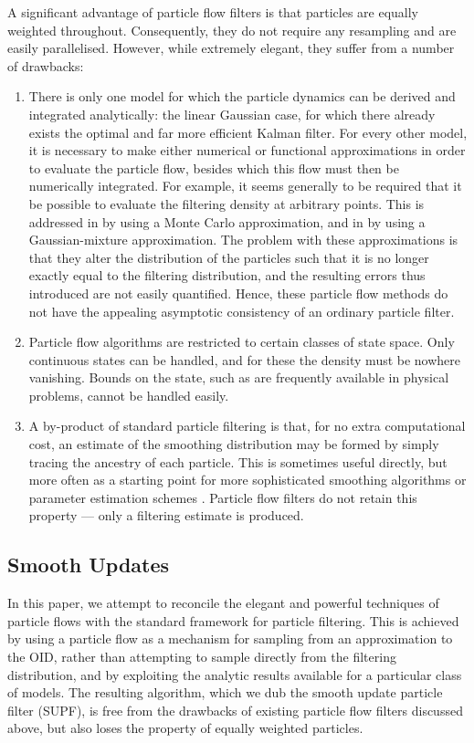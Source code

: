 \documentclass{statsoc}
\begin{document}
A significant advantage of particle flow filters is that particles are equally weighted throughout. Consequently, they do not require any resampling and are easily parallelised. However, while extremely elegant, they suffer from a number of drawbacks:
\begin{enumerate}
  \item There is only one model for which the particle dynamics can be derived and integrated analytically: the linear Gaussian case, for which there already exists the optimal and far more efficient Kalman filter. For every other model, it is necessary to make either numerical or functional approximations in order to evaluate the particle flow, besides which this flow must then be numerically integrated. For example, it seems generally to be required that it be possible to evaluate the filtering density at arbitrary points. This is addressed in \citep{Daum2012} by using a Monte Carlo approximation, and in \citep{Reich2012a} by using a Gaussian-mixture approximation. The problem with these approximations is that they alter the distribution of the particles such that it is no longer exactly equal to the filtering distribution, and the resulting errors thus introduced are not easily quantified. Hence, these particle flow methods do not have the appealing asymptotic consistency of an ordinary particle filter.
  \item Particle flow algorithms are restricted to certain classes of state space. Only continuous states can be handled, and for these the density must be nowhere vanishing. Bounds on the state, such as are frequently available in physical problems, cannot be handled easily.
  \item A by-product of standard particle filtering is that, for no extra computational cost, an estimate of the smoothing distribution may be formed by simply tracing the ancestry of each particle. This is sometimes useful directly, but more often as a starting point for more sophisticated smoothing algorithms \citep{Godsill2004,Bunch2012} or parameter estimation schemes \citep{Andrieu2010}. Particle flow filters do not retain this property --- only a filtering estimate is produced.
\end{enumerate}

\subsection{Smooth Updates}

In this paper, we attempt to reconcile the elegant and powerful techniques of particle flows with the standard framework for particle filtering. This is achieved by using a particle flow as a mechanism for sampling from an approximation to the OID, rather than attempting to sample directly from the filtering distribution, and by exploiting the analytic results available for a particular class of models. The resulting algorithm, which we dub the smooth update particle filter (SUPF), is free from the drawbacks of existing particle flow filters discussed above, but also loses the property of equally weighted particles.
\end{document}
